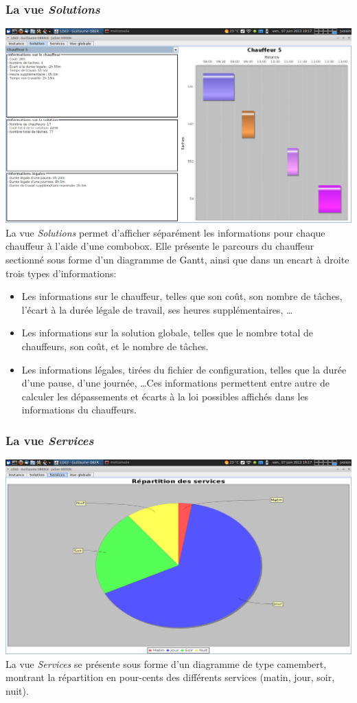\documentclass[12pt]{article}
\begin{document}
\subsubsection{La vue \emph{Solutions}}
\includegraphics[width=\textwidth]{chauffeur.png}
La vue \emph{Solutions} permet d'afficher séparément les informations pour chaque chauffeur à l'aide d'une combobox. Elle présente le parcours du chauffeur sectionné sous forme d'un diagramme de Gantt, ainsi que dans un encart à droite trois types d'informations:
\begin{itemize}
	\item Les informations sur le chauffeur, telles que son coût, son nombre de tâches, l'écart à la durée légale de travail, ses heures supplémentaires, \dots
    \item Les informations sur la solution globale, telles que le nombre total de chauffeurs, son coût, et le nombre de tâches.
    \item Les informations légales, tirées du fichier de configuration, telles que la durée d'une pause, d'une journée, \dots Ces informations permettent entre autre de calculer les dépassements et écarts à la loi possibles affichés dans les informations du chauffeurs.
\end{itemize}
\subsubsection{La vue \emph{Services}}
\includegraphics[width=\textwidth]{services.png}
La vue \emph{Services} se présente sous forme d'un diagramme de type camembert, montrant la répartition en pour-cents des différents services (matin, jour, soir, nuit).
\end{document}
